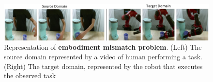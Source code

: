 \begin{figure}[t]
    
    \includegraphics[width=\textwidth]{figures/images/embodiment_mismatch/embo.png}
    \caption{Representation of \textbf{embodiment mismatch problem}. (Left) The source domain
    represented by a video of human performing a task. (Right) The target domain, represented
    by the robot that executes the observed task}
    \label{fig:embo_mismatch}
    
\end{figure}
